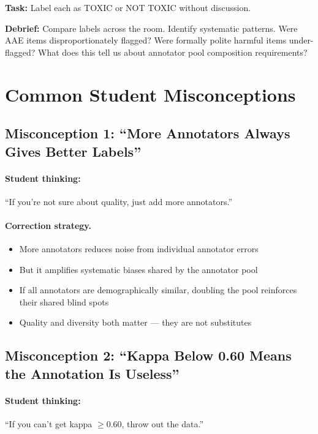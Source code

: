 \textbf{Task:} Label each as TOXIC or NOT TOXIC without discussion.

\textbf{Debrief:} Compare labels across the room. Identify systematic patterns. Were AAE items disproportionately flagged? Were formally polite harmful items under-flagged? What does this tell us about annotator pool composition requirements?

\section{Common Student Misconceptions}

\subsection{Misconception 1: ``More Annotators Always Gives Better Labels''}

\paragraph{Student thinking:} ``If you're not sure about quality, just add more annotators.''

\paragraph{Correction strategy.}
\begin{itemize}
    \item More annotators reduces noise from individual annotator errors
    \item But it amplifies systematic biases shared by the annotator pool
    \item If all annotators are demographically similar, doubling the pool reinforces their shared blind spots
    \item Quality and diversity both matter --- they are not substitutes
\end{itemize}

\subsection{Misconception 2: ``Kappa Below 0.60 Means the Annotation Is Useless''}

\paragraph{Student thinking:} ``If you can't get kappa $\geq 0.60$, throw out the data.''

